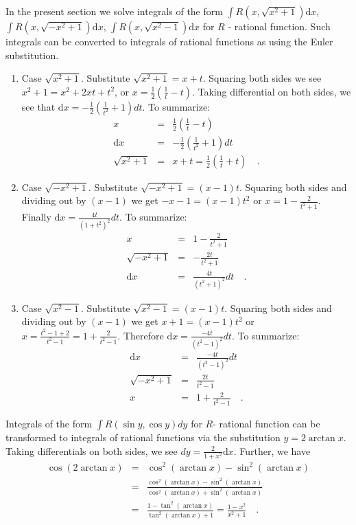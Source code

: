 \documentclass[12pt]{book}
\newcommand{\diff}{\text{d}}
\begin{document}
In the present section we solve integrals of the form $\int R(x, \sqrt{x^2+1})\diff x$, $\int R(x, \sqrt{-x^2+1})\diff x$, $\int R(x, \sqrt{x^2-1})\diff x$ for $R$ - rational function. Such integrals can be converted to integrals of rational functions as using the Euler substitution.

\begin{enumerate}
\item Case $\sqrt{x^2+1}$. Substitute $\sqrt{x^2+1}= x+t $. Squaring both sides we see $x^2+1=x^2+2xt+t^2$, or $x=\frac12\left(\frac{1}{t}- t\right)$. Taking differential on both sides, we see that $\diff x=-\frac12(\frac{1}{t^2}+1) dt$. To summarize:
\begin{equation}\label{eqEulerSub1}
\begin{array}{rcl}
x&=&\frac12\left(\frac{1}{t}- t\right)\\
\diff x&=&-\frac12(\frac{1}{t^2}+1) dt\\
\sqrt{x^2+1}&=&x+t= \frac12 \left(\frac1t +t\right) \quad .
\end{array}
\end{equation}
\item Case $\sqrt{-x^2+1}$. Substitute $\sqrt{-x^2+1}=(x-1)t$. Squaring both sides and dividing out by $(x-1)$ we get $-x-1=(x-1)t^2$ or $x=1-\frac{2}{t^2+1}$. Finally $\diff x=\frac{4t}{(1+t^2)^2}dt$. To summarize:
\[
\begin{array}{rcl}
x&=&1-\frac{2}{t^2+1}\\
\sqrt{-x^2+1}&=&-\frac{2t}{t^2+1}\\
\diff x&=&\frac{4t}{(t^2+1)^2}dt\quad .
\end{array}
\] 
\item Case $\sqrt{x^2-1} $. Substitute $\sqrt{x^2-1}=(x-1)t$. Squaring both sides and dividing out by $(x-1)$ we get $x+1=(x-1)t^2$ or $x=\frac{t^2-1+2}{t^2-1}= 1+\frac{2}{t^2-1}$. Therefore $\diff x=\frac{-4t}{(t^2-1)^2}dt$. To summarize:
\[
\begin{array}{rcl}
\diff x&=&\frac{-4t}{(t^2-1)^2}dt\\
\sqrt{-x^2+1}&=&\frac{2t}{t^2-1} \\
x&=&1+\frac{2}{t^2-1}\quad .
\end{array}
\] 
\end{enumerate}
Integrals of the form $\int R(\sin y,\cos y )dy$ for $R$- rational function can be transformed to integrals of rational functions via the substitution $y= 2\arctan x$. Taking differentials on both sides, we see $dy=\frac{2}{1+x^2}\diff x$. Further, we have 
\[
\begin{array}{rcl}
\cos (2\arctan x) &=&\displaystyle \cos^2(\arctan x)- \sin^2(\arctan x)\\
&=&  \frac{\cos^2(\arctan x)- \sin^2(\arctan x)}{\cos^2(\arctan x)+ \sin^2(\arctan x)}\\
&=& \displaystyle \frac{1- \tan^2(\arctan x)}{\tan^2(\arctan x)+1}= \frac{1- x^2}{x^2+1}\quad .
\end{array}
\]
\end{document}
